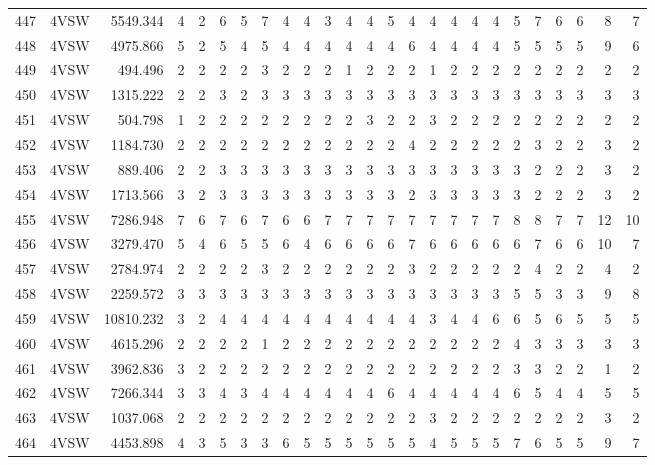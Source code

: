 \documentclass[12pt]{article}\usepackage[]{graphicx}\usepackage[]{color}
\begin{document}
\begin{landscapepage}
\begin{longtable}[t]{crrrrrrrrrrrrrrrcrrrrrrrr}
447 & 4VSW & 5549.344 & 4 & 2 & 6 & 5 & 7 & 4 & 4 & 3 & 4 & 4 & 5 & 4 & 4 & 4 & 4 & 4 & 5 & 7 & 6 & 6 & 8 & 7\\
448 & 4VSW & 4975.866 & 5 & 2 & 5 & 4 & 5 & 4 & 4 & 4 & 4 & 4 & 4 & 6 & 4 & 4 & 4 & 4 & 5 & 5 & 5 & 5 & 9 & 6\\
449 & 4VSW & 494.496 & 2 & 2 & 2 & 2 & 3 & 2 & 2 & 2 & 1 & 2 & 2 & 2 & 1 & 2 & 2 & 2 & 2 & 2 & 2 & 2 & 2 & 2\\
450 & 4VSW & 1315.222 & 2 & 2 & 3 & 2 & 3 & 3 & 3 & 3 & 3 & 3 & 3 & 3 & 3 & 3 & 3 & 3 & 3 & 3 & 3 & 3 & 3 & 3\\
451 & 4VSW & 504.798 & 1 & 2 & 2 & 2 & 2 & 2 & 2 & 2 & 2 & 3 & 2 & 2 & 3 & 2 & 2 & 2 & 2 & 2 & 2 & 2 & 2 & 2\\
452 & 4VSW & 1184.730 & 2 & 2 & 2 & 2 & 2 & 2 & 2 & 2 & 2 & 2 & 2 & 4 & 2 & 2 & 2 & 2 & 2 & 3 & 2 & 2 & 3 & 2\\
453 & 4VSW & 889.406 & 2 & 2 & 3 & 3 & 3 & 3 & 3 & 3 & 3 & 3 & 3 & 3 & 3 & 3 & 3 & 3 & 3 & 2 & 2 & 2 & 3 & 2\\
454 & 4VSW & 1713.566 & 3 & 2 & 3 & 3 & 3 & 3 & 3 & 3 & 3 & 3 & 3 & 2 & 3 & 3 & 3 & 3 & 3 & 2 & 2 & 2 & 3 & 2\\
455 & 4VSW & 7286.948 & 7 & 6 & 7 & 6 & 7 & 6 & 6 & 7 & 7 & 7 & 7 & 7 & 7 & 7 & 7 & 7 & 8 & 8 & 7 & 7 & 12 & 10\\
456 & 4VSW & 3279.470 & 5 & 4 & 6 & 5 & 5 & 6 & 4 & 6 & 6 & 6 & 6 & 7 & 6 & 6 & 6 & 6 & 6 & 7 & 6 & 6 & 10 & 7\\
457 & 4VSW & 2784.974 & 2 & 2 & 2 & 2 & 3 & 2 & 2 & 2 & 2 & 2 & 2 & 3 & 2 & 2 & 2 & 2 & 2 & 4 & 2 & 2 & 4 & 2\\
458 & 4VSW & 2259.572 & 3 & 3 & 3 & 3 & 3 & 3 & 3 & 3 & 3 & 3 & 3 & 3 & 3 & 3 & 3 & 3 & 5 & 5 & 3 & 3 & 9 & 8\\
459 & 4VSW & 10810.232 & 3 & 2 & 4 & 4 & 4 & 4 & 4 & 4 & 4 & 4 & 4 & 4 & 3 & 4 & 4 & 6 & 6 & 5 & 6 & 5 & 5 & 5\\
460 & 4VSW & 4615.296 & 2 & 2 & 2 & 2 & 1 & 2 & 2 & 2 & 2 & 2 & 2 & 2 & 2 & 2 & 2 & 2 & 4 & 3 & 3 & 3 & 3 & 3\\
461 & 4VSW & 3962.836 & 3 & 2 & 2 & 2 & 2 & 2 & 2 & 2 & 2 & 2 & 2 & 2 & 2 & 2 & 2 & 2 & 3 & 3 & 2 & 2 & 1 & 2\\
462 & 4VSW & 7266.344 & 3 & 3 & 4 & 3 & 4 & 4 & 4 & 4 & 4 & 4 & 6 & 4 & 4 & 4 & 4 & 4 & 6 & 5 & 4 & 4 & 5 & 5\\
463 & 4VSW & 1037.068 & 2 & 2 & 2 & 2 & 2 & 2 & 2 & 2 & 2 & 2 & 2 & 2 & 3 & 2 & 2 & 2 & 2 & 2 & 2 & 2 & 3 & 2\\
464 & 4VSW & 4453.898 & 4 & 3 & 5 & 3 & 3 & 6 & 5 & 5 & 5 & 5 & 5 & 5 & 4 & 5 & 5 & 5 & 7 & 6 & 5 & 5 & 9 & 7\\

\end{longtable}
\end{landscapepage}
\end{document}
